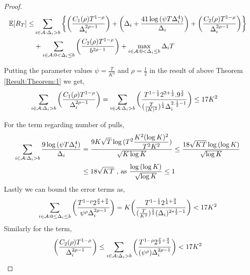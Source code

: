 \begin{proof}
\begin{align*}
\mathbb{E} [R_{T}] \leq &\sum\limits_{i\in \mathcal{A} :\Delta_{i} > b}\bigg\lbrace\bigg(\dfrac{C_{1}(\rho)T^{1-\rho}}{\Delta_{i}^{2\rho -1}}\bigg) + \bigg(\Delta_{i}+\dfrac{41\log{(\psi  T\Delta_{i}^{4})}}{\Delta_{i}}\bigg) + \bigg(\dfrac{ C_{2}(\rho) T^{1-\rho}}{\Delta_{i}^{2\rho-1}} \bigg)\bigg \rbrace\\ 
  & +\sum\limits_{i\in \mathcal{A} :0 < \Delta_{i}\leq b}\bigg(\dfrac{C_{2}(\rho)T^{1-\rho}}{b^{2\rho -1}} \bigg) + \max_{i\in \mathcal{A} :0 < \Delta_{i}\leq b}\Delta_{i}T
\end{align*}
%
%	
%

Putting the parameter values $\psi=\frac{T}{K^2}$ and $\rho=\frac{1}{2}$ in the result of above Theorem \ref{Result:Theorem:1} we get,
	\begin{align*}
	\sum_{i\in \mathcal{A} :\Delta_{i} > b}\bigg(\dfrac{C_{1}(\rho)T^{1-\rho}}{\Delta_{i}^{2\rho -1}}\bigg) &= \sum_{i\in \mathcal{A} :\Delta_{i} > b}\bigg(\dfrac{T^{1-\frac{1}{2}}2^{2+\frac{1}{2}}.9^{\frac{1}{2}}}{(\frac{T}{( K)^2})^{\frac{1}{2}}\Delta_{i}^{2.\frac{1}{2}-1}} \bigg) \leq 17 K^2
	\end{align*}
	 
	
	For the term regarding number of pulls,
	\begin{align*}
	\sum_{i\in \mathcal{A} :\Delta_{i} > b}\dfrac{9\log{(\psi T\Delta_{i}^{4})}}{\Delta_{i}} &= \dfrac{9K\sqrt{T}\log{(T^{2}\dfrac{K^{2}(\log K)^{2}}{T^{2} K^2})}}{\sqrt{K\log K}} \leq  \dfrac{18\sqrt{KT}\log{(\log K)}}{\sqrt{\log K}}\\
	&\leq 18\sqrt{KT} \text{ ,   as $\dfrac{\log{(\log K)}}{\sqrt{\log K}}\leq 1$}
	\end{align*}		
 	Lastly we can bound the error terms as, 
	\begin{align*}
	\sum\limits_{i\in \mathcal{A} :0\leq\Delta_{i}\leq b}\bigg(\dfrac{T^{1-\rho }2^{\frac{\rho}{2} +\frac{9}{4}}}{\psi^{\rho }\Delta_{i}^{2\rho -1}} \bigg)=K\bigg(\dfrac{T^{1-\frac{1}{2}}2^{\frac{1}{4}+\frac{9}{4}}}{{(\frac{T}{K^2})^{\frac{1}{2}}}{(\Delta_{i})^{2*\frac{1}{2}-1}}} \bigg) < 17 K^2
	\end{align*}	 	
 	Similarly for the term,
 	\begin{align*}
 	\bigg(\dfrac{ C_{2}(\rho) T^{1-\rho}}{\Delta_{i}^{2\rho-1}} \bigg) \leq  \sum_{i\in \mathcal{A} : \Delta_{i} > b}\bigg(\dfrac{T^{1-\rho} 2^{\frac{\rho}{2}+\frac{9}{4}}}{(\psi^{\rho})\Delta_{i}^{2\rho -1}} \bigg) < 17  K^2
	\end{align*} 	
 	

\end{proof}
